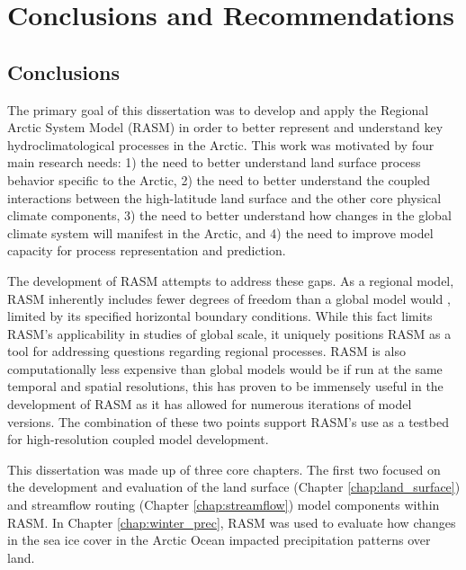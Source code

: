 \chapter{Conclusions and Recommendations}
\label{chap:conclusions}

\section{Conclusions}
The primary goal of this dissertation was to develop and apply the Regional Arctic System Model (RASM) in order to better represent and understand key hydroclimatological processes in the Arctic.
This work was motivated by four main research needs: 1) the need to better understand land surface process behavior specific to the Arctic, 2) the need to better understand the coupled interactions between the high-latitude land surface and the other core physical climate components, 3) the need to better understand how changes in the global climate system will manifest in the Arctic, and 4) the need to improve model capacity for process representation and prediction.

The development of RASM attempts to address these gaps.
As a regional model, RASM inherently includes fewer degrees of freedom than a global model would \citep[e.g. ][]{Deser_2016}, limited by its specified horizontal boundary conditions.
While this fact limits RASM's applicability in studies of global scale, it uniquely positions RASM as a tool for addressing questions regarding regional processes.
RASM is also computationally less expensive than global models would be if run at the same temporal and spatial resolutions, this has proven to be immensely useful in the development of RASM as it has allowed for numerous iterations of model versions.
The combination of these two points support RASM's use as a testbed for high-resolution coupled model development.

This dissertation was made up of three core chapters.
The first two focused on the development and evaluation of the land surface (Chapter \ref{chap:land_surface}) and streamflow routing (Chapter \ref{chap:streamflow}) model components within RASM.
In Chapter \ref{chap:winter_prec}, RASM was used to evaluate how changes in the sea ice cover in the Arctic Ocean impacted precipitation patterns over land.

